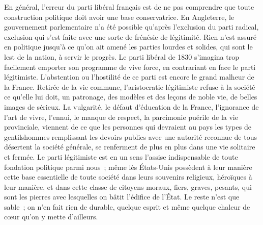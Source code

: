 \documentclass[french,twoside]{book} %
\begin{document}
En général, l’erreur du parti libéral français est de ne pas comprendre que toute construction politique doit avoir une base conservatrice. En Angleterre, le gouvernement parlementaire n’a été possible qu’après l’exclusion du parti radical, exclusion qui s’est faite avec une sorte de frénésie de légitimité. Rien n’est assuré en politique jusqu’à ce qu’on ait amené les parties lourdes et solides, qui sont le lest de la nation, à servir le progrès. Le parti libéral de 1830 s’imagina trop facilement emporter son programme de vive force, en contrariant en face le parti légitimiste. L’abstention ou l’hostilité de ce parti est encore le grand malheur de la France. Retirée de la vie commune, l’aristocratie légitimiste refuse à la société ce qu’elle lui doit, un patronage, des modèles et des leçons de noble vie, de belles images de sérieux. La vulgarité, le défaut d’éducation de la France, l’ignorance de l’art de vivre, l’ennui, le manque de respect, la parcimonie puérile de la vie provinciale, viennent de ce que les personnes qui devraient au pays les types de gentilshommes remplissant les devoirs publics avec une autorité reconnue de tous désertent la société générale, se renferment de plus en plus dans une vie solitaire et fermée. Le parti légitimiste est en un sens l’assise indispensable de toute fondation politique parmi nous ; même lès États-Unis possèdent à leur manière cette base essentielle de toute société dans leurs souvenirs religieux, héroïques à leur manière, et dans cette classe de citoyens moraux, fiers, graves, pesants, qui sont les pierres avec lesquelles on bâtit l’édifice de l’État. Le reste n’est que sable ; on n’en fait rien de durable, quelque esprit et même quelque chaleur de cœur qu’on y mette d’ailleurs.\par
\end{document}
